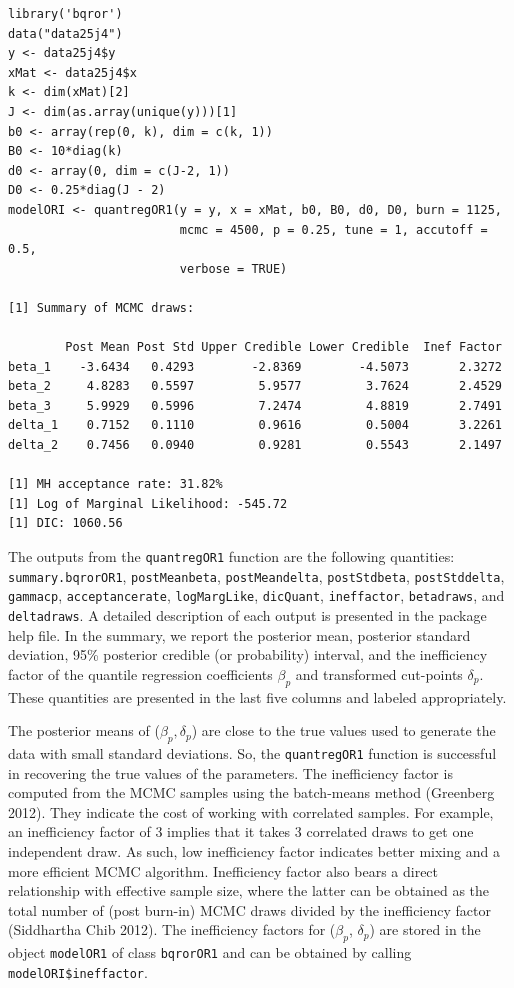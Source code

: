 \begin{verbatim}
library('bqror')
data("data25j4")
y <- data25j4$y
xMat <- data25j4$x
k <- dim(xMat)[2]
J <- dim(as.array(unique(y)))[1]
b0 <- array(rep(0, k), dim = c(k, 1))
B0 <- 10*diag(k)
d0 <- array(0, dim = c(J-2, 1))
D0 <- 0.25*diag(J - 2)
modelORI <- quantregOR1(y = y, x = xMat, b0, B0, d0, D0, burn = 1125,
                        mcmc = 4500, p = 0.25, tune = 1, accutoff = 0.5,
                        verbose = TRUE)

[1] Summary of MCMC draws:

        Post Mean Post Std Upper Credible Lower Credible  Inef Factor
beta_1    -3.6434   0.4293        -2.8369        -4.5073       2.3272
beta_2     4.8283   0.5597         5.9577         3.7624       2.4529
beta_3     5.9929   0.5996         7.2474         4.8819       2.7491
delta_1    0.7152   0.1110         0.9616         0.5004       3.2261
delta_2    0.7456   0.0940         0.9281         0.5543       2.1497

[1] MH acceptance rate: 31.82%
[1] Log of Marginal Likelihood: -545.72
[1] DIC: 1060.56
\end{verbatim}

The outputs from the \texttt{quantregOR1} function are the following quantities: \texttt{summary.bqrorOR1}, \texttt{postMeanbeta}, \texttt{postMeandelta}, \texttt{postStdbeta}, \texttt{postStddelta}, \texttt{gammacp}, \texttt{acceptancerate}, \texttt{logMargLike}, \texttt{dicQuant}, \texttt{ineffactor}, \texttt{betadraws}, and \texttt{deltadraws}. A detailed description of each output is presented in the  package help file. In the summary, we report the posterior mean, posterior standard deviation, 95\% posterior credible (or probability) interval, and the inefficiency factor of the quantile regression coefficients \(\beta_{p}\) and transformed cut-points \(\delta_{p}\). These quantities are presented in the last five columns and labeled appropriately.

The posterior means of (\(\beta_{p}, \delta_{p}\)) are close to the true values used to generate the data with small standard deviations. So, the \texttt{quantregOR1} function is successful in recovering the true values of the parameters. The inefficiency factor is computed from the MCMC samples using the batch-means method (Greenberg 2012). They indicate the cost of working with correlated samples. For example, an inefficiency factor of 3 implies that it takes 3 correlated draws to get one independent draw. As such, low inefficiency factor indicates better mixing and a more efficient MCMC algorithm. Inefficiency factor also bears a direct relationship with effective sample size, where the latter can be obtained as the total number of (post burn-in) MCMC draws divided by the inefficiency factor (Siddhartha Chib 2012). The inefficiency factors for (\(\beta_{p}\), \(\delta_{p}\)) are stored in the object \texttt{modelOR1} of class \texttt{bqrorOR1} and can be obtained by calling \texttt{modelORI\$ineffactor}.

